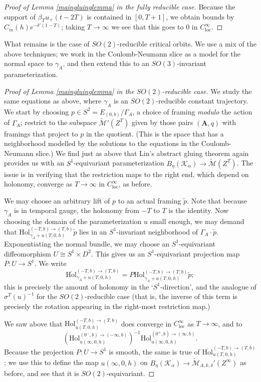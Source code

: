\documentclass{memo-l}
\theoremstyle{definition}
\theoremstyle{remark}
\numberwithin{section}{chapter}
\numberwithin{equation}{chapter}
\begin{document}
\begin{proof}[Proof of Lemma \ref{maingluinglemma} in the fully reducible case]
Because the support of $\beta_T u_+(t-2T)$ is contained in $[0, T+1]$, we obtain bounds by $C_m(h) e^{- \delta'(1-T)}$; taking $T \to \infty$ we see that this goes to $0$ in $C^\infty_{\text{loc}}$.
\end{proof}

What remains is the case of $SO(2)$-reducible critical orbits. We use a mix of the above techniques; we work in the Coulomb-Neumann slice as a model for the normal space to $\gamma_A$, and then extend this to an $SO(3)$-invariant parameterization.

\begin{proof}[Proof of Lemma \ref{maingluinglemma} in the $SO(2)$-reducible case]
We study the same equations as above, where $\gamma_A$ is an $SO(2)$-reducible constant trajectory. We start by choosing $p \in S^2 = E_{(0,b)}/\Gamma_A$, a choice of framing \emph{modulo} the action of $\Gamma_A$; restrict to the subspace $\widetilde{\mathcal M}'(Z^T)$ given by those pairs $(\mathbf{A},q)$ with framings that project to $p$ in the quotient. (This is the space that has a neighborhood modelled by the solutions to the equations in the Coulomb-Neumann slice.) We find just as above that Lin's abstract gluing theorem again provides us with an $S^1$-equivariant parameterization $B_\eta(\mathcal K_\alpha) \to \widetilde{\mathcal M}(Z^T)$. The issue is in verifying that the restriction maps to the right end, which depend on holonomy, converge as $T \to \infty$ in $C^\infty_{\text{loc}}$, as before.

We may choose an arbitrary lift of $p$ to an actual framing $\tilde p$. Note that because $\gamma_A$ is in temporal gauge, the holonomy from $-T$ to $T$ is the identity. Now choosing the domain of the parameterization $u$ small enough, we may demand that $\text{Hol}^{(-T,b) \to (T, b)}_{\gamma_A + u(T, 0, h)} \tilde p$ lies in an $S^1$-invariant neighborhood of $\Gamma_A \cdot \tilde p$. Exponentiating the normal bundle, we may choose an $S^1$-equivariant diffeomorphism $U \cong S^1 \times D^2$. This gives us an $S^1$-equivariant projection map $P: U \to S^1$. We write $$\overline{\text{Hol}}^{(-T,b) \to (T,b)}_{\gamma_A + u(T,0,h)} = P\text{Hol}^{(-T,b) \to (T,b)}_{\gamma_A + u(T,0,h)}\tilde p;$$ this is precisely the amount of holonomy in the `$S^1$-direction', and the analogue of $\sigma^T(u)^{-1}$ for the $SO(2)$-reducible case (that is, the inverse of this term is precisely the rotation appearing in the right-most restriction map.)

We saw above that $\text{Hol}^{(-T,b) \to (T,b)}_{u(T, 0, h)}$ does converge in $C^\infty_{\text{loc}}$ as $T \to \infty$, and to $$\left(\text{Hol}^{(0^-, b) \to (-\infty, b)}_{u(\infty, 0, h)}\right)^{-1} \text{Hol}^{(0^+, b) \to (\infty, b)}_{u(\infty, 0, h)}.$$ Because the projection $P: U \to S^1$ is smooth, the same is true of $\overline{\text{Hol}}^{(-T,b) \to (T,b)}_{u(T, 0, h)}$; we use this to define the map $u(\infty, 0, h)$ on $B_\eta(\mathcal K_\alpha) \to \widetilde{\mathcal M}_{A,k,\delta}'(Z^\infty)$ as before, and see that it is $SO(2)$-equivariant.


\end{proof}
\end{document}
